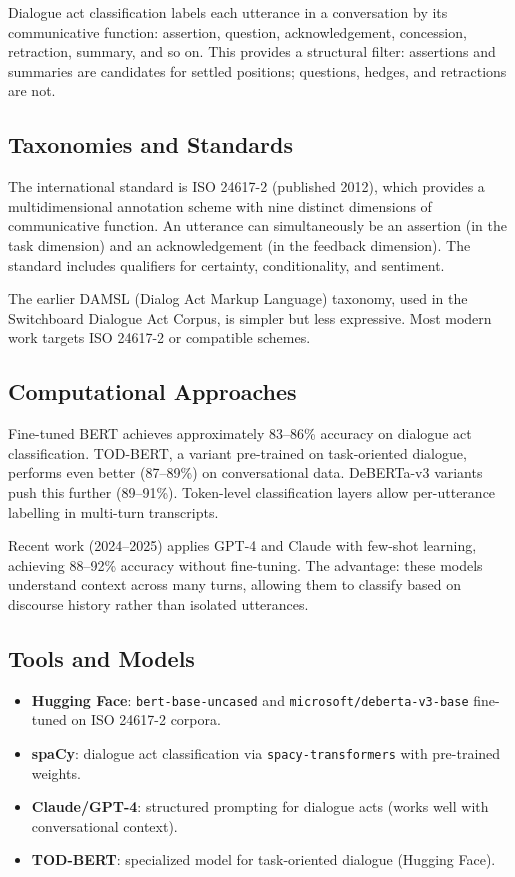 \documentclass[11pt,letterpaper]{article}
\begin{document}
Dialogue act classification labels each utterance in a conversation by its communicative function: assertion, question, acknowledgement, concession, retraction, summary, and so on. This provides a structural filter: assertions and summaries are candidates for settled positions; questions, hedges, and retractions are not.

\subsection{Taxonomies and Standards}

The international standard is ISO 24617-2 (published 2012), which provides a multidimensional annotation scheme with nine distinct dimensions of communicative function. An utterance can simultaneously be an assertion (in the task dimension) and an acknowledgement (in the feedback dimension). The standard includes qualifiers for certainty, conditionality, and sentiment.

The earlier DAMSL (Dialog Act Markup Language) taxonomy, used in the Switchboard Dialogue Act Corpus, is simpler but less expressive. Most modern work targets ISO 24617-2 or compatible schemes.

\subsection{Computational Approaches}

Fine-tuned BERT achieves approximately 83–86\% accuracy on dialogue act classification. TOD-BERT, a variant pre-trained on task-oriented dialogue, performs even better (87–89\%) on conversational data. DeBERTa-v3 variants push this further (89–91\%). Token-level classification layers allow per-utterance labelling in multi-turn transcripts.

Recent work (2024–2025) applies GPT-4 and Claude with few-shot learning, achieving 88–92\% accuracy without fine-tuning. The advantage: these models understand context across many turns, allowing them to classify based on discourse history rather than isolated utterances.

\subsection{Tools and Models}

\begin{itemize}
  \item \textbf{Hugging Face}: \texttt{bert-base-uncased} and \texttt{microsoft/deberta-v3-base} fine-tuned on ISO 24617-2 corpora.
  \item \textbf{spaCy}: dialogue act classification via \texttt{spacy-transformers} with pre-trained weights.
  \item \textbf{Claude/GPT-4}: structured prompting for dialogue acts (works well with conversational context).
  \item \textbf{TOD-BERT}: specialized model for task-oriented dialogue (Hugging Face).
\end{itemize}
\end{document}
